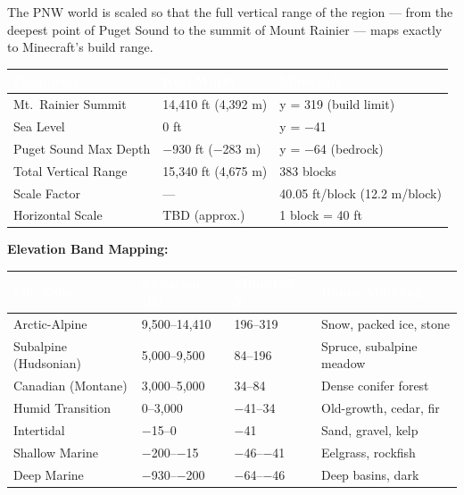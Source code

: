 \documentclass[11pt,letterpaper]{article}
\newcommand{\tableheader}[1]{\textbf{\sffamily\textcolor{white}{#1}}}
\begin{document}
The PNW world is scaled so that the full vertical range of the region --- from the deepest point of Puget Sound to the summit of Mount Rainier --- maps exactly to Minecraft's build range.

\begin{center}
\begin{tabularx}{\textwidth}{L{4.5cm}XC{3cm}}
\toprule
{}
\tableheader{Parameter} & \tableheader{Real World} & \tableheader{Minecraft} \\
\midrule
Mt.\ Rainier Summit & 14,410 ft (4,392 m) & y = 319 (build limit) \\
Sea Level & 0 ft & y = $-$41 \\
Puget Sound Max Depth & $-$930 ft ($-$283 m) & y = $-$64 (bedrock) \\
Total Vertical Range & 15,340 ft (4,675 m) & 383 blocks \\
Scale Factor & --- & 40.05 ft/block (12.2 m/block) \\
Horizontal Scale & TBD (approx.) & 1 block = 40 ft \\
\bottomrule
\end{tabularx}
\end{center}

\textbf{Elevation Band Mapping:}

\begin{center}
\begin{tabularx}{\textwidth}{L{3.5cm}C{2.5cm}C{2.5cm}X}
\toprule
{}
\tableheader{Life Zone} & \tableheader{Elevation (ft)} & \tableheader{Minecraft Y} & \tableheader{Biome Mapping} \\
\midrule
Arctic-Alpine & 9,500--14,410 & 196--319 & Snow, packed ice, stone \\
Subalpine (Hudsonian) & 5,000--9,500 & 84--196 & Spruce, subalpine meadow \\
Canadian (Montane) & 3,000--5,000 & 34--84 & Dense conifer forest \\
Humid Transition & 0--3,000 & $-$41--34 & Old-growth, cedar, fir \\
Intertidal & $-$15--0 & $-$41 & Sand, gravel, kelp \\
Shallow Marine & $-$200--$-$15 & $-$46--$-$41 & Eelgrass, rockfish \\
Deep Marine & $-$930--$-$200 & $-$64--$-$46 & Deep basins, dark \\
\bottomrule
\end{tabularx}
\end{center}
\end{document}
